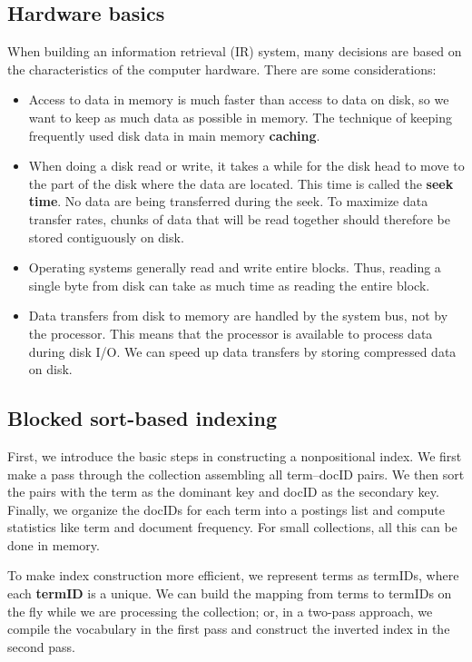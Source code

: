 \documentclass[letterpaper,11pt]{article}
\begin{document}
\subsection{Hardware basics}
When building an information retrieval (IR) system, many decisions are based on the characteristics of the computer hardware. There are some considerations:
\begin{itemize}
    \item Access to data in memory is much faster than access to data on disk, so we want to keep as much data as possible in memory. The technique of keeping frequently used disk data in main memory \textbf{caching}.
    \item When doing a disk read or write, it takes a while for the disk head to move to the part of the disk where the data are located. This time is called the \textbf{seek time}. No data are being transferred during the seek. To maximize data transfer rates, chunks of data that will be read together should therefore be stored contiguously on disk.
    \item Operating systems generally read and write entire blocks. Thus, reading a single byte from disk can take as much time as reading the entire block.
    \item Data transfers from disk to memory are handled by the system bus, not by the processor. This means that the processor is available to process data during disk I/O. We can speed up data transfers by storing compressed data on disk.
\end{itemize}

\subsection{Blocked sort-based indexing}
First, we introduce the basic steps in constructing a nonpositional index. We first make a pass through the collection assembling all term–docID pairs. We then sort the pairs with the term as the dominant key and docID as the secondary key. Finally, we organize the docIDs for each term into a postings list and compute statistics like term and document frequency. For small collections, all this can be done in memory.

To make index construction more efficient, we represent terms as termIDs, where each \textbf{termID} is a unique. We can build the mapping from terms to termIDs on the fly while we are processing the collection; or, in a two-pass approach, we compile the vocabulary in the first pass and construct the inverted index in the second pass.
\end{document}
